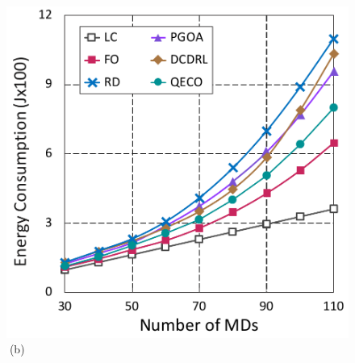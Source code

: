 \documentclass[12pt,draftclsnofoot,onecolumn]{IEEEtran}
\begin{document}
\begin{enumerate}
\begin{figure}[H]
\begin{minipage}[b]{0.3\linewidth}
		\includegraphics[width=\textwidth]{ energy_2}
		\textcolor{white}{i}\hspace{0.6cm}(b)
	\end{minipage}


\end{figure}
\end{enumerate}
\end{document}
